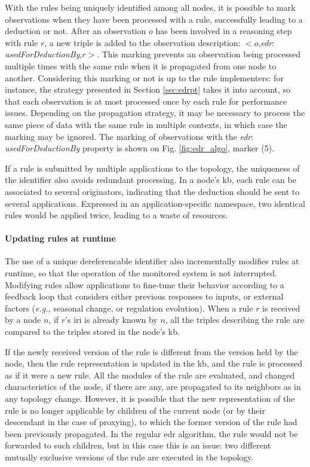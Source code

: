 \documentclass[sw]{iosart2x}
\newcommand{\namespace}[1]{\textit{#1$:$}}
\newcommand{\concept}[2]{\namespace{#1}\-\textit{#2}}
\newcommand{\triplet}[3]{$<$#1,\textit{#2},#3$>$}
\begin{document}
With the rules being uniquely identified among all nodes, it is possible to mark observations when they have been processed with a rule, successfully leading to a deduction or not.
After an observation $o$ has been involved in a reasoning step with rule $r$, a new triple is added to the observation description: \triplet{$o$}{\concept{edr}{used\-For\-Deduction\-By}}{$r$}.
This marking prevents an observation being processed multiple times with the same rule when it is propagated from one node to another.
Considering this marking or not is up to the rule implementers: for instance, the strategy presented in Section \textsection \ref{sec:edrpt} takes it into account, so that each observation is at most processed once by each rule for performance issues.
Depending on the propagation strategy, it may be necessary to process the same piece of data with the same rule in multiple contexts, in which case the marking may be ignored.
The marking of observations with the \concept{edr}{used\-For\-Deduction\-By} property is shown on Fig. \ref{fig:edr_algo}, marker (5).

If a rule is submitted by multiple applications to the topology, the uniqueness of the identifier also avoids redundant processing.
In a node's \gls{kb}, each rule can be associated to several originators, indicating that the deduction should be sent to several applications.
Expressed in an application-specific namespace, two identical rules would be applied twice, leading to a waste of resources.

\paragraph{Updating rules at runtime} 

The use of a unique dereferencable identifier also incrementally modifies rules at runtime, so that the operation of the monitored system is not interrupted.
Modifying rules allow applications to fine-tune their behavior according to a feedback loop that considers either previous responses to inputs, or external factors (\textit{e.g.,} seasonal change, or regulation evolution).
When a rule $r$ is received by a node $n$, if $r$'s \gls{iri} is already known by $n$, all the triples describing the rule are compared to the triples stored in the node's \gls{kb}.

If the newly received version of the rule is different from the version held by the node, then the rule representation is updated in the \gls{kb}, and the rule is processed as if it were a new rule.
All the modules of the rule are evaluated, and changed characteristics of the node, if there are any, are propagated to its neighbors as in any topology change.
However, it is possible that the new representation of the rule is no longer applicable by children of the current node (or by their descendant in the case of proxying), to which the former version of the rule had been previously propagated.
In the regular \gls{edr} algorithm, the rule would not be forwarded to such children, but in this case this is an issue: two different mutually exclusive versions of the rule are executed in the topology.
\end{document}
